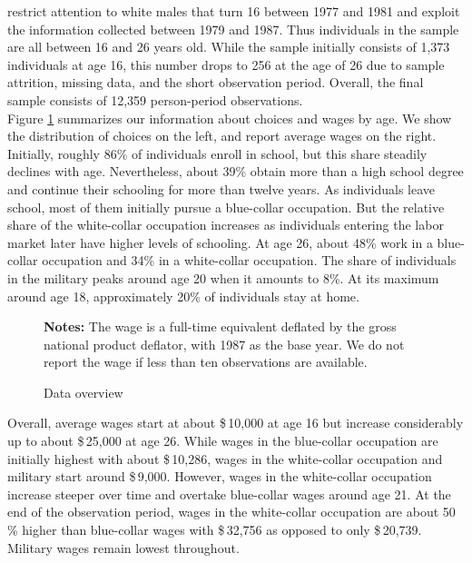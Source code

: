 \noindent \citet{Keane.1997} restrict attention to white males that turn 16 between 1977 and 1981 and exploit the information collected between 1979 and 1987. Thus individuals in the sample are all between 16 and 26 years old. While the sample initially consists of 1,373 individuals at age 16, this number drops to 256 at the age of 26 due to sample attrition, missing data, and the short observation period. Overall, the final sample consists of 12,359 person-period observations.\\

\noindent Figure \ref{Overview} summarizes our information about choices and wages by age. We show the distribution of choices on the left, and report average wages on the right. Initially, roughly 86\% of individuals enroll in school, but this share steadily declines with age. Nevertheless, about 39\% obtain more than a high school degree and continue their schooling for more than twelve years. As individuals leave school, most of them initially pursue a blue-collar occupation. But the relative share of the white-collar occupation increases as individuals entering the labor market later have higher levels of schooling. At age 26, about 48\% work in a blue-collar occupation and 34\% in a white-collar occupation. The share of individuals in the military peaks around age 20 when it amounts to 8\%. At its maximum around age 18, approximately 20\% of individuals stay at home.
%
\begin{figure}[h!]\centering
\caption{Data overview}\label{Overview}
\hspace{0.3cm}
\begin{center}
\begin{minipage}[t]{0.75\columnwidth}
\item \scriptsize{\textbf{Notes:} The wage is a full-time equivalent deflated by the gross national product deflator, with 1987 as the base year. We do not report the wage if less than ten observations are available.}
\end{minipage}
\end{center}
\end{figure}\FloatBarrier
%
\noindent Overall, average wages start at about \$\,10,000 at age 16 but increase considerably up to about \$\,25,000 at age 26. While wages in the blue-collar occupation are initially highest with about \$\,10,286, wages in the white-collar occupation and military start around \$\,9,000. However, wages in the white-collar occupation increase steeper over time and overtake blue-collar wages around age 21. At the end of the observation period, wages in the white-collar occupation are about 50\,\% higher than blue-collar wages with \$\,32,756 as opposed to only \$\,20,739. Military wages remain lowest throughout.\\

